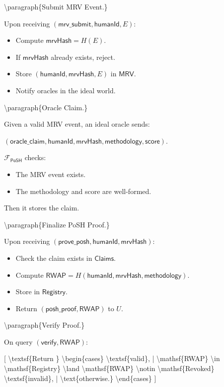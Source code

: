 \documentclass{article}
\begin{document}
{{\textbackslash}paragraph\{Submit MRV Event.\}

Upon receiving $(\textsf{mrv\_submit}, \mathsf{humanId}, E)$:

\begin{itemize}
\item Compute $\mathsf{mrvHash} = H(E)$.
\item If $\mathsf{mrvHash}$ already exists, reject.
\item Store $(\mathsf{humanId}, \mathsf{mrvHash}, E)$ in $\mathsf{MRV}$.
\item Notify oracles in the ideal world.
\end{itemize}

{\textbackslash}paragraph\{Oracle Claim.\}

Given a valid MRV event, an ideal oracle sends:

$(\textsf{oracle\_claim}, \mathsf{humanId}, \mathsf{mrvHash}, \mathsf{methodology}, \mathsf{score})$.

$\mathcal{F}_{\textsf{PoSH}}$ checks:

\begin{itemize}
\item The MRV event exists.
\item The methodology and score are well-formed.
\end{itemize}

Then it stores the claim.

{\textbackslash}paragraph\{Finalize PoSH Proof.\}

Upon receiving $(\textsf{prove\_posh}, \mathsf{humanId}, \mathsf{mrvHash})$:

\begin{itemize}
\item Check the claim exists in $\mathsf{Claims}$.
\item Compute $\mathsf{RWAP} = H(\mathsf{humanId}, \mathsf{mrvHash}, \mathsf{methodology})$.
\item Store in $\mathsf{Registry}$.
\item Return $(\textsf{posh\_proof}, \mathsf{RWAP})$ to $U$.
\end{itemize}

{\textbackslash}paragraph\{Verify Proof.\}

On query $(\textsf{verify}, \mathsf{RWAP})$:

[
{\textbackslash}textsf\{Return \}
{\textbackslash}begin\{cases\}
{\textbackslash}textsf\{valid\}, | {\textbackslash}mathsf\{RWAP\} {\textbackslash}in {\textbackslash}mathsf\{Registry\} {\textbackslash}land {\textbackslash}mathsf\{RWAP\} {\textbackslash}notin {\textbackslash}mathsf\{Revoked\}
{\textbackslash}textsf\{invalid\}, | {\textbackslash}text\{otherwise.\}
{\textbackslash}end\{cases\}
]

}
\end{document}
